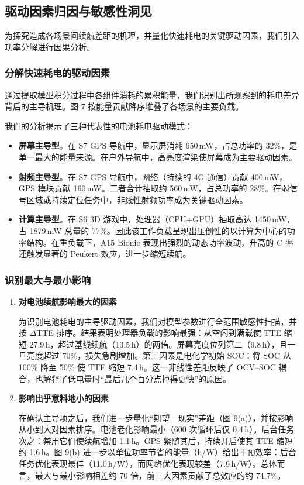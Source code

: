 \documentclass[11pt,a4paper]{ctexart}
\begin{document}
\subsection{驱动因素归因与敏感性洞见}

为探究造成各场景间续航差距的机理，并量化快速耗电的关键驱动因素，我们引入功率分解进行因果分析。

\subsubsection{分解快速耗电的驱动因素}

通过提取模型积分过程中各组件消耗的累积能量，我们识别出所观察到的耗电差异背后的主导机理。图 7 按能量贡献降序堆叠了各场景的主要负载。

我们的分析揭示了三种代表性的电池耗电驱动模式：

\begin{itemize}[leftmargin=2em]
\item \textbf{屏幕主导型}。在 S7 GPS 导航中，显示屏消耗 650\,mW，占总功率的 32\%，是单一最大的能量来源。在户外导航中，高亮度渲染使屏幕成为主要驱动因素。
\item \textbf{射频主导型}。在 S7 GPS 导航中，网络（持续的 4G 通信）贡献 400\,mW，GPS 模块贡献 160\,mW。二者合计抽取约 560\,mW，占总功率的 28\%。在弱信号区域或持续定位任务中，非线性射频功率成为关键驱动因素。
\item \textbf{计算主导型}。在 S6 3D 游戏中，处理器（CPU+GPU）抽取高达 1450\,mW，占 1879\,mW 总量的 77\%。因此该工作负载呈现出压倒性的以计算为中心的功率结构。在重负载下，A15 Bionic 表现出强烈的动态功率波动，升高的 C 率还触发显著的 Peukert 效应，进一步缩短续航。
\end{itemize}

\subsubsection{识别最大与最小影响}

\begin{enumerate}[leftmargin=2.6em,label=（\alph*）]
\item \textbf{对电池续航影响最大的因素}

为识别电池耗电的主导驱动因素，我们对模型参数进行全范围敏感性扫描，并按 $\Delta$TTE 排序。结果表明处理器负载的影响最强：从空闲到满载使 TTE 缩短 27.9\,h，超过基线续航（13.5\,h）的两倍。屏幕亮度位列第二（9.8\,h），且一旦亮度超过 70\%，损失急剧增加。第三因素是电化学初始 SOC：将 SOC 从 100\% 降至 50\% 使 TTE 缩短 7.4\,h。这一非线性差距反映了 OCV--SOC 耦合，也解释了低电量时“最后几个百分点掉得更快”的原因。

\item \textbf{影响出乎意料地小的因素}

在确认主导项之后，我们进一步量化“期望—现实”差距（图 9(a)），并按影响从小到大对因素排序。电池老化影响最小（600 次循环后仅 0.4\,h）。后台任务次之：禁用它们使续航增加 1.1\,h。GPS 紧随其后，持续开启使其 TTE 缩短约 1.6\,h。图 9(b) 进一步以单位功率节省的能量（h/W）给出干预效率：后台任务优化表现最佳（11.0\,h/W），而网络优化表现较差（7.9\,h/W）。总体而言，最大与最小影响相差约 70 倍，前三大因素贡献了总效应的约 74.7\%。
\end{enumerate}
\end{document}
